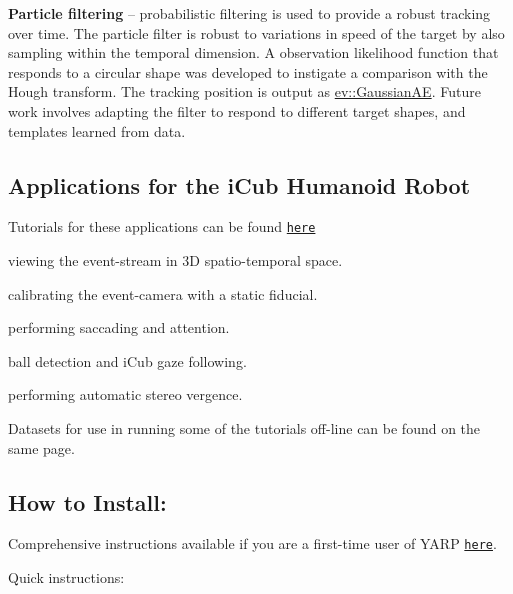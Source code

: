 \begin{DoxyItemize}
\item {\bfseries Particle filtering} -- probabilistic filtering is used to provide a robust tracking over time. The particle filter is robust to variations in speed of the target by also sampling within the temporal dimension. A observation likelihood function that responds to a circular shape was developed to instigate a comparison with the Hough transform. The tracking position is output as {\ttfamily \hyperlink{classev_1_1GaussianAE}{ev\+::\+Gaussian\+AE}}. Future work involves adapting the filter to respond to different target shapes, and templates learned from data.
\end{DoxyItemize}

\subsection*{Applications for the i\+Cub Humanoid Robot}

Tutorials for these applications can be found \href{http://robotology.github.io/event-driven/doxygen/doc/html/pages.html}{\tt here}


\begin{DoxyItemize}
\item viewing the event-\/stream in 3D spatio-\/temporal space.
\item calibrating the event-\/camera with a static fiducial.
\item performing saccading and attention.
\item ball detection and i\+Cub gaze following.
\item performing automatic stereo vergence.
\end{DoxyItemize}

Datasets for use in running some of the tutorials off-\/line can be found on the same page.

\subsection*{How to Install\+:}

Comprehensive instructions available if you are a first-\/time user of Y\+A\+RP \href{http://robotology.github.io/event-driven/doxygen/doc/html/pages.html}{\tt here}.

Quick instructions\+:


